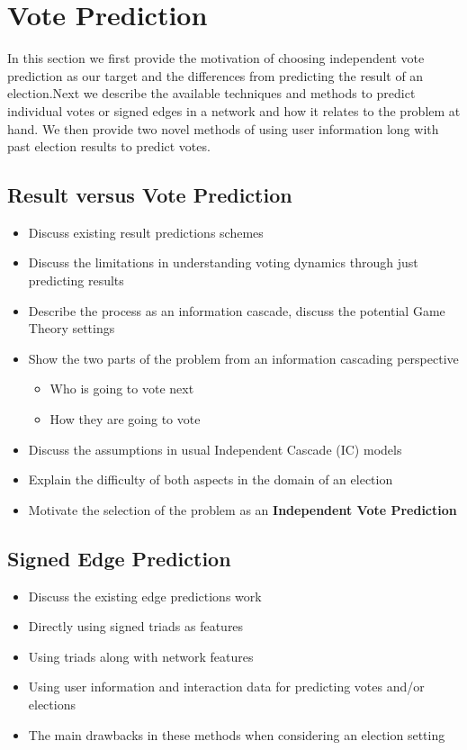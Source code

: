 \chapter{Vote Prediction}
\label{chp:vote-predicition}
In this section we first provide the motivation of choosing independent vote prediction as our target and the differences from predicting the result of an election.Next we describe the available techniques and methods to predict individual votes or signed edges in a network and how it relates to the problem at hand. We then provide two novel methods of using user information long with past election results to predict votes.

\section{Result versus Vote Prediction}
\begin{itemize}
    \item Discuss existing result predictions schemes
    \item Discuss the limitations in understanding voting dynamics through just predicting results
    \item Describe the process as an information cascade, discuss the potential Game Theory settings
    \item Show the two parts of the problem from an information cascading perspective 
     \begin{itemize}
        \item Who is going to vote next
        \item How they are going to vote
    \end{itemize}
    \item Discuss the assumptions in usual Independent Cascade (IC) models
    \item Explain the difficulty of both aspects in the domain of an election 
    \item Motivate the selection of the problem as an \textbf{Independent Vote Prediction}
\end{itemize}


\section{Signed Edge Prediction}
\begin{itemize}
    \item Discuss the existing edge predictions work
    \item Directly using signed triads as features
    \item Using triads along with network features
    \item Using user information and interaction data for predicting votes and/or elections
    \item The main drawbacks in these methods when considering an election setting
\end{itemize}
